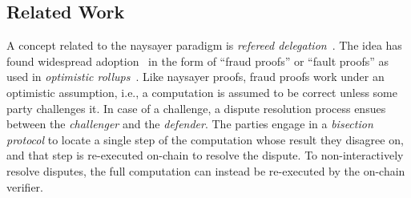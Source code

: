 \subsection{Related Work}
\label{sec:naysayer-related}



A concept related to the naysayer paradigm is \emph{refereed delegation}~\cite{STOC:FeiKil97}. The idea has found widespread adoption~\cite{ARXIV:TeuRei19,USENIX:KGCWF18} in the form of ``fraud proofs'' or ``fault proofs'' as used in \emph{optimistic rollups}~\cite{ethereum_optimistic,arbitrum_nitro,optimism_rollup}. Like naysayer proofs, fraud proofs work under an optimistic assumption, i.e., a computation is assumed to be correct unless some party challenges it. In case of a challenge, a dispute resolution process ensues between the \emph{challenger} and the \emph{defender}. The parties engage in a \emph{bisection protocol} to locate a single step of the computation whose result they disagree on, and that step is re-executed on-chain to resolve the dispute. 
To non-interactively resolve disputes, the full computation can instead be re-executed by the on-chain verifier.



